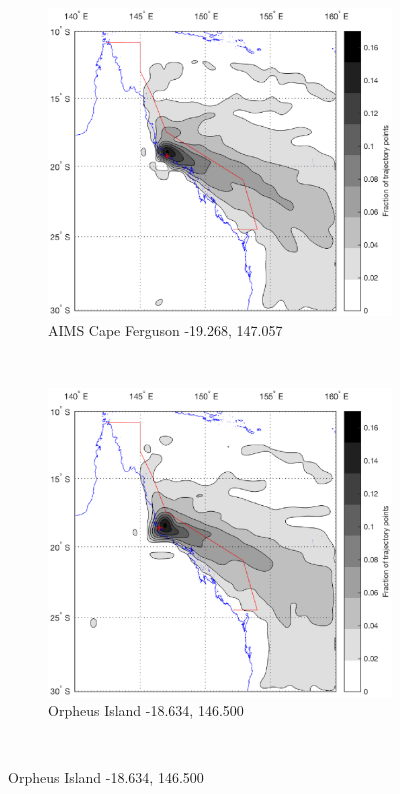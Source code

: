 \clearpage
	
\begin{figure}[!t]\ContinuedFloat
    \centering
    \begin{subfigure}[b]{0.45\textwidth}
        \includegraphics[width=\textwidth]{Fig/Research/BT_Coast/Map_103.eps}
	    \caption{AIMS Cape Ferguson -19.268, 147.057}
	    \label{subfig:orph}
    \end{subfigure}
	~
	\begin{subfigure}[b]{0.45\textwidth}
		\includegraphics[width=\textwidth]{Fig/Research/BT_Coast/Map_104.eps}
		\caption{Orpheus Island -18.634, 146.500}
		\label{subfig:luci}
	\end{subfigure}
	\\


\end{figure}
